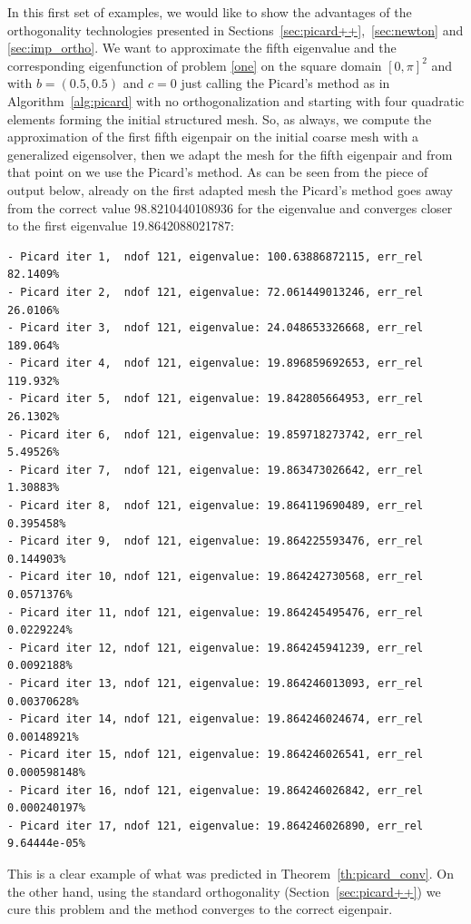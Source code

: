 \documentclass[smallextended]{svjour3}
\begin{document}
In this first set of examples, we would like to show the advantages of the orthogonality technologies presented in Sections~\ref{sec:picard++},~\ref{sec:newton} and \ref{sec:imp_ortho}.
We want to approximate the fifth eigenvalue and the corresponding eigenfunction of problem \eqref{one} on the square domain $[0,\pi]^2$ and with $b=(0.5,0.5)$ and $c=0$ just calling the Picard's method as in Algorithm~\ref{alg:picard} with no orthogonalization and starting with four quadratic elements forming the initial structured mesh.
So, as always, we compute the approximation of the first fifth eigenpair on the initial coarse mesh with a generalized eigensolver, then we adapt the mesh for the fifth eigenpair and from that point on we use the Picard's method.
As can be seen from the piece of output below, already on the first adapted mesh the Picard's method goes away from the correct value 98.8210440108936 for the eigenvalue and converges closer to the first eigenvalue 19.8642088021787: \\

{\small
\begin{verbatim}
- Picard iter 1,  ndof 121, eigenvalue: 100.63886872115, err_rel 82.1409%
- Picard iter 2,  ndof 121, eigenvalue: 72.061449013246, err_rel 26.0106%
- Picard iter 3,  ndof 121, eigenvalue: 24.048653326668, err_rel 189.064%
- Picard iter 4,  ndof 121, eigenvalue: 19.896859692653, err_rel 119.932%
- Picard iter 5,  ndof 121, eigenvalue: 19.842805664953, err_rel 26.1302%
- Picard iter 6,  ndof 121, eigenvalue: 19.859718273742, err_rel 5.49526%
- Picard iter 7,  ndof 121, eigenvalue: 19.863473026642, err_rel 1.30883%
- Picard iter 8,  ndof 121, eigenvalue: 19.864119690489, err_rel 0.395458%
- Picard iter 9,  ndof 121, eigenvalue: 19.864225593476, err_rel 0.144903%
- Picard iter 10, ndof 121, eigenvalue: 19.864242730568, err_rel 0.0571376%
- Picard iter 11, ndof 121, eigenvalue: 19.864245495476, err_rel 0.0229224%
- Picard iter 12, ndof 121, eigenvalue: 19.864245941239, err_rel 0.0092188%
- Picard iter 13, ndof 121, eigenvalue: 19.864246013093, err_rel 0.00370628%
- Picard iter 14, ndof 121, eigenvalue: 19.864246024674, err_rel 0.00148921%
- Picard iter 15, ndof 121, eigenvalue: 19.864246026541, err_rel 0.000598148%
- Picard iter 16, ndof 121, eigenvalue: 19.864246026842, err_rel 0.000240197%
- Picard iter 17, ndof 121, eigenvalue: 19.864246026890, err_rel 9.64444e-05%
\end{verbatim}
}

\vspace{4mm}
\noindent
This is a clear example of what was predicted in Theorem~\ref{th:picard_conv}.
On the other hand, using the standard orthogonality (Section~\ref{sec:picard++}) we cure this problem and the method 
converges to the correct eigenpair. 
\end{document}
